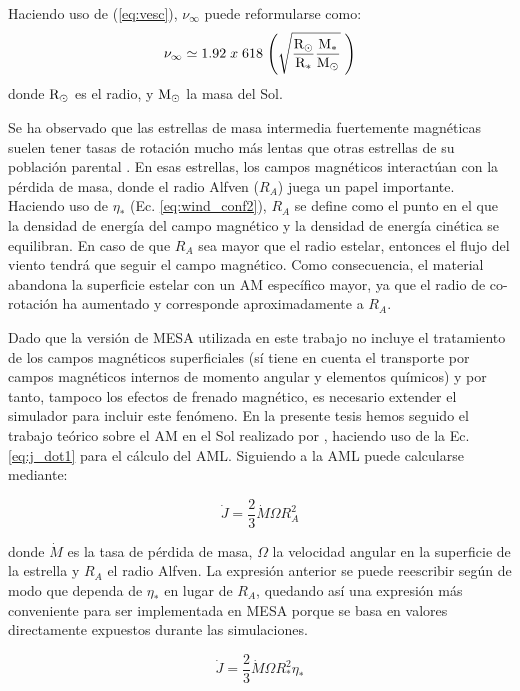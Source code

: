 Haciendo uso de (\ref{eq:vesc}), $\nu_\infty$ puede reformularse como:
\begin{equation}
    \nu_\infty \simeq 1.92 \; x \; 618 \; \Bigg(\sqrt{\frac{\mathrm{R}_\odot}{\mathrm{R}_*}\frac{\mathrm{M}_*}{\mathrm{M}_\odot}} \;\Bigg) \label{eq:vinf}
\end{equation}
donde ${\mathrm{R}_\odot}$ es el radio, y ${\mathrm{M}_\odot}$ la masa del Sol.


Se ha observado que las estrellas de masa intermedia fuertemente magnéticas suelen tener tasas de rotación mucho más lentas que otras estrellas de su población parental \cite{Mathys2006}. En esas estrellas, los campos magnéticos interactúan con la pérdida de masa, donde el radio Alfven ($R_{A}$) juega un papel importante. Haciendo uso de $\eta_*$ (Ec. \ref{eq:wind_conf2}), $R_{A}$ se define como el punto en el que la densidad de energía del campo magnético y la densidad de energía cinética se equilibran. En caso de que $R_{A}$ sea mayor que el radio estelar, entonces el flujo del viento tendrá que seguir el campo magnético. Como consecuencia, el material abandona la superficie estelar con un AM específico mayor, ya que el radio de co-rotación ha aumentado y corresponde aproximadamente a $R_{A}$.\par

Dado que la versión de MESA utilizada en este trabajo no incluye el tratamiento de los campos magnéticos superficiales (sí tiene en cuenta el transporte por campos magnéticos internos de momento angular y elementos químicos) y por tanto, tampoco los efectos de frenado magnético, es necesario extender el simulador para incluir este fenómeno. En la presente tesis hemos seguido el trabajo teórico sobre el AM en el Sol realizado por \cite{Weber1967}, haciendo uso de la Ec.~ \ref{eq:j_dot1} para el cálculo del AML. Siguiendo a \cite{Weber1967} la AML puede calcularse mediante:

\begin{equation}
 \Dot{J} = \frac{2}{3} \Dot{M}\Omega R^{2}_{A} \label{eq:j_dot1}
\end{equation}

donde $\Dot{M}$ es la tasa de pérdida de masa, $\Omega$ la velocidad angular en la superficie de la estrella y $R_A$ el radio Alfven. La expresión anterior se puede reescribir según \cite{Ud-Doula2008} de modo que dependa de $\eta_*$ en lugar de $R_A$, quedando así una expresión más conveniente para ser implementada en MESA porque se basa en valores directamente expuestos durante las simulaciones.


\begin{equation}
 \Dot{J} = \frac{2}{3} \Dot{M}\Omega R^{2}_{*}\eta_* \label{eq:j_dot_mesa}
\end{equation}



